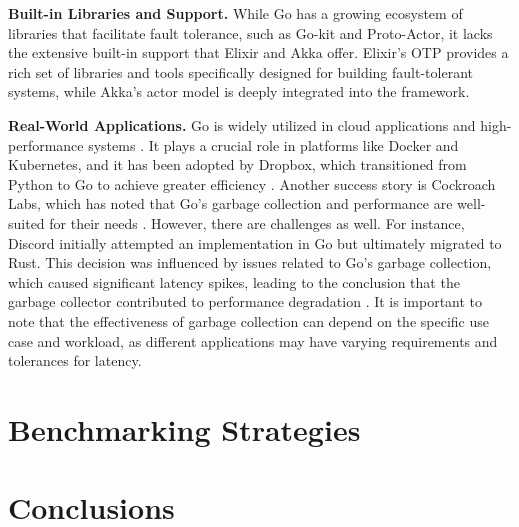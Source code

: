 \textbf{Built-in Libraries and Support.} While Go has a growing ecosystem of libraries that facilitate fault tolerance, such as Go-kit and Proto-Actor, it lacks the extensive built-in support that Elixir and Akka offer. Elixir's OTP provides a rich set of libraries and tools specifically designed for building fault-tolerant systems, while Akka's actor model is deeply integrated into the framework. 

\textbf{Real-World Applications.} Go is widely utilized in cloud applications and high-performance systems \cite{Zhao2023}. It plays a crucial role in platforms like Docker and Kubernetes, and it has been adopted by Dropbox, which transitioned from Python to Go to achieve greater efficiency \cite{go-docs}. Another success story is Cockroach Labs, which has noted that Go's garbage collection and performance are well-suited for their needs \cite{go-docs}. However, there are challenges as well. For instance, Discord initially attempted an implementation in Go but ultimately migrated to Rust. This decision was influenced by issues related to Go's garbage collection, which caused significant latency spikes, leading to the conclusion that the garbage collector contributed to performance degradation \cite{discord-blog-rust-go}. It is important to note that the effectiveness of garbage collection can depend on the specific use case and workload, as different applications may have varying requirements and tolerances for latency.

\section{Benchmarking Strategies}



\section{Conclusions}